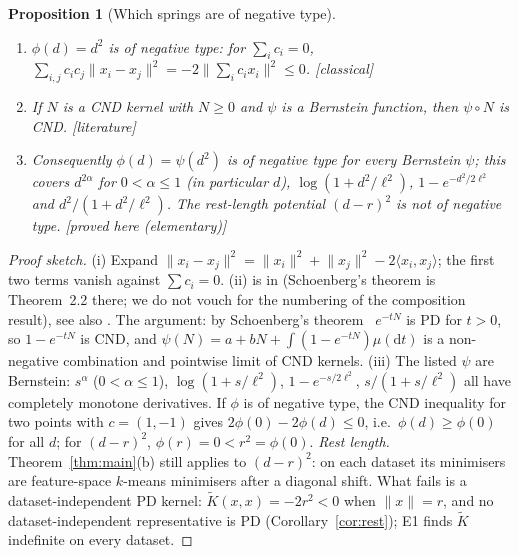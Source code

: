 \documentclass[11pt,a4paper]{article}
\theoremstyle{plain}
\newtheorem{proposition}[theorem]{Proposition}
\theoremstyle{definition}
\theoremstyle{remark}
\newcommand{\dd}{\mathrm{d}}
\newcommand{\status}[1]{\textsf{\small [#1]}}
\begin{document}
\begin{proposition}[Which springs are of negative type]\label{prop:bernstein}
\begin{enumerate}[label=(\roman*),leftmargin=2em]
\item $\phi(d)=d^2$ is of negative type: for $\sum_ic_i=0$, $\sum_{i,j}c_ic_j\lVert x_i-x_j\rVert^2=-2\bigl\lVert\sum_ic_ix_i\bigr\rVert^2\le0$. \status{classical}
\item If $N$ is a CND kernel with $N\ge0$ and $\psi$ is a Bernstein function, then $\psi\circ N$ is CND. \status{literature}
\item Consequently $\phi(d)=\psi(d^2)$ is of negative type for every Bernstein $\psi$; this covers $d^{2\alpha}$ for $0<\alpha\le1$ (in particular $d$), $\log(1+d^2/\ell^2)$, $1-e^{-d^2/2\ell^2}$ and $d^2/(1+d^2/\ell^2)$. The rest-length potential $(d-r)^2$ is \emph{not} of negative type. \status{proved here (elementary)}
\end{enumerate}
\end{proposition}
\begin{proof}[Proof sketch]
(i) Expand $\lVert x_i-x_j\rVert^2=\lVert x_i\rVert^2+\lVert x_j\rVert^2-2\langle x_i,x_j\rangle$; the first two terms vanish against $\sum c_i=0$. (ii) is in \citet[Ch.~3, \S2]{bcr1984} (Schoenberg's theorem is Theorem~2.2 there; we do not vouch for the numbering of the composition result), see also \citet{ssv2012}. The argument: by Schoenberg's theorem~\citep{schoenberg1938} $e^{-tN}$ is PD for $t>0$, so $1-e^{-tN}$ is CND, and $\psi(N)=a+bN+\int(1-e^{-tN})\mu(\dd t)$ is a non-negative combination and pointwise limit of CND kernels. (iii) The listed $\psi$ are Bernstein: $s^\alpha$ ($0<\alpha\le1$), $\log(1+s/\ell^2)$, $1-e^{-s/2\ell^2}$, $s/(1+s/\ell^2)$ all have completely monotone derivatives. If $\phi$ is of negative type, the CND inequality for two points with $c=(1,-1)$ gives $2\phi(0)-2\phi(d)\le0$, i.e.\ $\phi(d)\ge\phi(0)$ for all $d$; for $(d-r)^2$, $\phi(r)=0<r^2=\phi(0)$.
\emph{Rest length.} Theorem~\ref{thm:main}(b) still applies to $(d-r)^2$: on each dataset its minimisers are feature-space $k$-means minimisers after a diagonal shift. What fails is a dataset-independent PD kernel: $\widetilde K(x,x)=-2r^2<0$ when $\lVert x\rVert=r$, and no dataset-independent representative is PD (Corollary~\ref{cor:rest}); E1 finds $\widetilde K$ indefinite on every dataset.
\end{proof}
\end{document}
